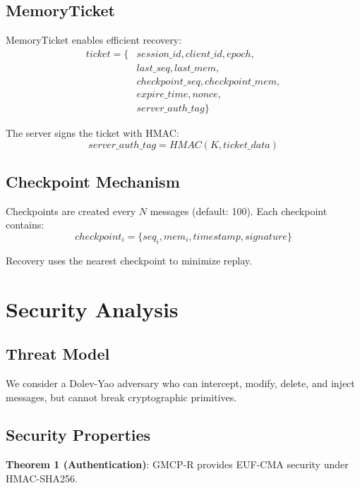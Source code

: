 \documentclass[conference]{IEEEtran}
\begin{document}
\subsection{MemoryTicket}

MemoryTicket enables efficient recovery:
\begin{equation}
\begin{aligned}
ticket = \{&session\_id, client\_id, epoch,\\
&last\_seq, last\_mem,\\
&checkpoint\_seq, checkpoint\_mem,\\
&expire\_time, nonce,\\
&server\_auth\_tag\}
\end{aligned}
\end{equation}

The server signs the ticket with HMAC:
\begin{equation}
server\_auth\_tag = HMAC(K, ticket\_data)
\end{equation}

\subsection{Checkpoint Mechanism}

Checkpoints are created every $N$ messages (default: 100). Each checkpoint contains:
\begin{equation}
checkpoint_i = \{seq_i, mem_i, timestamp, signature\}
\end{equation}

Recovery uses the nearest checkpoint to minimize replay.

\section{Security Analysis}
\label{sec:security}

\subsection{Threat Model}

We consider a Dolev-Yao adversary who can intercept, modify, delete, and inject messages, but cannot break cryptographic primitives.

\subsection{Security Properties}

\textbf{Theorem 1 (Authentication)}: GMCP-R provides EUF-CMA security under HMAC-SHA256.
\end{document}
